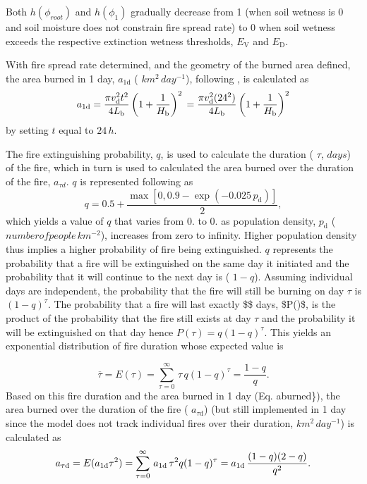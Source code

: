 Both $h(\phi_{root})$ and $h(\phi_{1})$ gradually decrease from 1 (when soil wetness is 0 and soil moisture does not constrain fire spread rate) to 0 when soil wetness exceeds the respective extinction wetness thresholds, $E_\mathrm{V}$ and $E_\mathrm{D}$.

With fire spread rate determined, and the geometry of the burned area defined, the area burned in 1 day, $a_{1{\mathrm{d}}}$ ( $km^2\,day^{-1}$), following \cite{Li20121c2}, is calculated as \[ a_{1{\mathrm{d}}} = \frac{\pi v_\mathrm{d}^2 t^2}{4L_\mathrm{b}}\left(1 + \frac{1}{H_\mathrm{b}}\right)^2 \nonumber\\ = \frac{\pi v_\mathrm{d}^2 (24^2)}{4L_\mathrm{b}}\left(1 + \frac{1}{H_\mathrm{b}}\right)^2\label{aburned} \] by setting $t$ equal to $24\,h$.

The fire extinguishing probability, $q$, is used to calculate the duration ( $\tau$, $days$) of the fire, which in turn is used to calculated the area burned over the duration of the fire, ${a_{\tau d}}$. $q$ is represented following \cite{Kloster2010-633} as \[ q = 0.5 + \frac{\max\left[0,0.9 - \exp(-0.025\,p_\mathrm{d})\right]}{2}, \] which yields a value of $q$ that varies from 0. to 0. as population density, $p_\mathrm{d}$ ( $number of people\,km^{-2}$), increases from zero to infinity. Higher population density thus implies a higher probability of fire being extinguished. $q$ represents the probability that a fire will be extinguished on the same day it initiated and the probability that it will continue to the next day is ( $1-q$). Assuming individual days are independent, the probability that the fire will still be burning on day $\tau$ is $(1-q)^\tau$. The probability that a fire will last exactly \$\$ days, \$\+P()\$, is the product of the probability that the fire still exists at day $\tau$ and the probability it will be extinguished on that day hence $P(\tau) = q(1-q)^\tau$. This yields an exponential distribution of fire duration whose expected value is

\[ \overline{\tau} = E(\tau) = \sum_{\tau=0}^\infty\,\tau\,q(1-q)^{\tau} = \frac{1-q}{q}. \] Based on this fire duration and the area burned in 1 day (Eq. aburned\}), the area burned over the duration of the fire ( $a_{\tau \mathrm{d}}$) (but still implemented in 1 day since the model does not track individual fires over their duration, $km^2\,day^{-1}$) is calculated as \[ a_{\tau \mathrm{d}} =E(a_{1{\mathrm{d}}} \tau^2)=\sum_{\tau=0}^\infty\,a_{1{\mathrm{d}}}\,\tau^2 q(1-q)^{\tau} \\ = a_{1{\mathrm{d}}}\,\frac{(1-q) (2-q)}{q^2}.\nonumber \]

